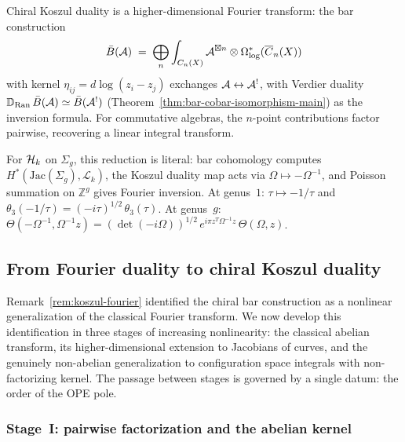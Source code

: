 \begin{remark}
\label{rem:koszul-fourier}
Chiral Koszul duality is a higher-dimensional Fourier transform: the bar construction
\[
\bar{B}(\mathcal{A}) \;=\; \bigoplus_n
  \int_{C_n(X)} \mathcal{A}^{\boxtimes n}
  \otimes \Omega^*_{\log}(\overline{C}_n(X))
\]
with kernel $\eta_{ij} = d\log(z_i - z_j)$ exchanges $\mathcal{A} \leftrightarrow \mathcal{A}^!$, with Verdier duality $\mathbb{D}_{\operatorname{Ran}}\, \bar{B}(\mathcal{A}) \simeq \bar{B}(\mathcal{A}^!)$ (Theorem~\ref{thm:bar-cobar-isomorphism-main}) as the inversion formula.  For commutative algebras, the $n$-point contributions factor pairwise, recovering a linear integral transform.

For $\mathcal{H}_k$ on $\Sigma_g$, this reduction is literal: bar cohomology computes $H^*(\mathrm{Jac}(\Sigma_g), \mathcal{L}_k)$, the Koszul duality map acts via $\Omega \mapsto -\Omega^{-1}$, and Poisson summation on $\mathbb{Z}^g$ gives Fourier inversion.  At genus~$1$: $\tau \mapsto -1/\tau$ and $\theta_3(-1/\tau) = (-i\tau)^{1/2}\,\theta_3(\tau)$.  At genus~$g$: $\Theta(-\Omega^{-1}, \Omega^{-1}z) = (\det(-i\Omega))^{1/2}\, e^{i\pi z^T \Omega^{-1} z}\, \Theta(\Omega, z)$.
\end{remark}

\subsection{From Fourier duality to chiral Koszul duality}
\label{subsec:fourier-to-koszul}

Remark~\ref{rem:koszul-fourier} identified the chiral bar construction
as a nonlinear generalization of the classical Fourier transform.  We
now develop this identification in three stages of increasing
nonlinearity: the classical abelian transform, its higher-dimensional
extension to Jacobians of curves, and the genuinely non-abelian
generalization to configuration space integrals with non-factorizing
kernel.  The passage between stages is governed by a single datum:
the order of the OPE pole.

\subsubsection{Stage~I: pairwise factorization and the abelian kernel}


